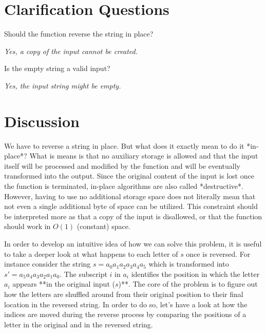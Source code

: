 \section{Clarification Questions}

\begin{QandA}
	\item Should the function reverse the string in place?
	\begin{answered}
		\textit{Yes, a copy of the input cannot be created.}
	\end{answered}

	\item Is the empty string a valid input?
	\begin{answered}
		\textit{Yes, the input string might be empty.}
	\end{answered}
	
\end{QandA}

\section{Discussion}
\label{string_reverse:sec:discussion}

We have to reverse a string in place. But what does it exactly mean to do it
*in-place*? 
What is means is that no auxiliary storage is allowed and that the input itself will be
processed and modified by the function and will be eventually transformed into the output.
Since the original
content of the input is lost once the function is terminated, in-place algorithms are also called
*destructive*.
However, having to use no additional storage space does not literally mean that not even a single additional
byte of space can be utilized. This constraint should be interpreted more as that a copy of the input is
disallowed, or that the function should work in $O(1)$ (constant) space.

In order to develop an intuitive idea of how we can solve this problem, it is useful to take a deeper look at what happens to each letter of $s$ once is reversed.
For instance consider the string $s=a_0 a_1 a_2 a_3 a_4 a_5$ which is transformed into $s'=a_5
a_4 a_3 a_2 a_1 a_0$. The subscript $i$ in $a_i$ identifies the position in which the letter $a_i$
appears **in the original input ($s$)**. 
The core of the problem is to figure out how the letters are shuffled around
from their original position to their final location in the reversed string.
In order to do so, let's have a look at how the indices are
moved during the reverse process by comparing the positions of a letter in the original and in the reversed string.



